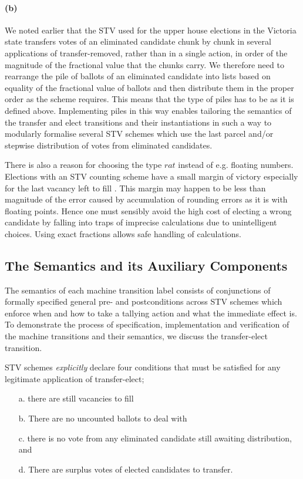 \documentclass[10pt,conference]{IEEEtran}
\begin{document}
\paragraph*{(b)} We noted earlier that the STV used for the upper house elections in the Victoria state transfers votes of an eliminated candidate chunk by chunk in several applications of transfer-removed, rather than in a single action, in order of the magnitude of the fractional value that the chunks carry. We therefore need to rearrange the pile of ballots of an eliminated candidate into lists based on equality of the fractional value of ballots and then distribute them in the proper order as the scheme requires. This means that the type of piles has to be as it is defined above. Implementing piles in this way enables
tailoring the semantics of the transfer and elect transitions and their instantiations in such a way to modularly formalise several STV schemes which use the last parcel and/or stepwise distribution of votes from eliminated candidates. 


There is also a reason for choosing the type $rat$  
instead of e.g. floating numbers. Elections with an STV counting scheme have a small margin of victory especially for the last vacancy left to fill \cite{MBlo}. This margin may happen to be less than magnitude of the error caused by accumulation of rounding errors as it is with floating points.  Hence one must sensibly avoid the high  cost of electing a wrong candidate by falling into traps of imprecise calculations due to unintelligent choices. Using exact fractions allows safe handling of calculations. 
\subsection{The Semantics and its Auxiliary Components}
\label{sec:MachineSem}

The semantics of each machine transition label consists of conjunctions of formally specified general pre- and postconditions across STV schemes which enforce when and how to take a tallying action and what the immediate effect is. To demonstrate the process of specification, implementation and verification of the machine transitions and their semantics, we discuss the transfer-elect transition.


STV schemes \emph{explicitly} declare four conditions that must be satisfied  for any legitimate application of transfer-elect; 
\begin{itemize}
\item[a.] there are still vacancies to fill
\item[b.] There are no uncounted ballots to deal with
\item[c.] there is no vote from any eliminated candidate still awaiting distribution, and
\item[d.] There are surplus votes of elected candidates to  transfer.
\end{itemize}
\end{document}
